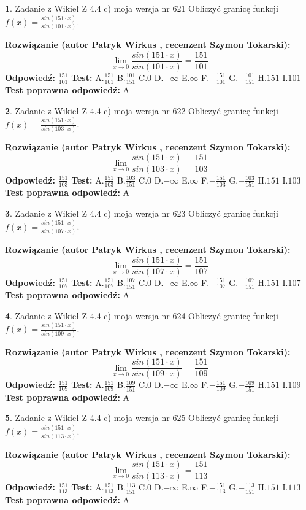 \documentclass[12pt, a4paper]{article}
\theoremstyle{definition} %
\newtheorem{zad}{}
\newcommand{\zadStart}[1]{\begin{zad}#1\newline}
\newcommand{\zadStop}{\end{zad}}
\newcommand{\rozwStart}[2]{\noindent \textbf{Rozwiązanie (autor #1 , recenzent #2): }\newline}
\newcommand{\rozwStop}{\newline}
\newcommand{\odpStart}{\noindent \textbf{Odpowiedź:}\newline}
\newcommand{\odpStop}{\newline}
\newcommand{\testStart}{\noindent \textbf{Test:}\newline}
\newcommand{\testStop}{\newline}
\newcommand{\kluczStart}{\noindent \textbf{Test poprawna odpowiedź:}\newline}
\newcommand{\kluczStop}{\newline}
\begin{document}
\zadStart{Zadanie z Wikieł Z 4.4 c) moja wersja nr 621}
Obliczyć granicę funkcji $f(x)=\frac{sin(151\cdot x)}{sin(101\cdot x)}$.
\zadStop
\rozwStart{Patryk Wirkus}{Szymon Tokarski}
$$\lim\limits_{x\to 0}\frac{sin(151\cdot x)}{sin(101\cdot x)}=
\frac{151}{101}$$
\rozwStop
\odpStart
$\frac{151}{101}$
\odpStop
\testStart
A.$\frac{151}{101}$
B.$\frac{101}{151}$
C.$0$
D.$-\infty$
E.$\infty$
F.$-\frac{151}{101}$
G.$-\frac{101}{151}$
H.$151$
I.$101$
\testStop
\kluczStart
A
\kluczStop



\zadStart{Zadanie z Wikieł Z 4.4 c) moja wersja nr 622}
Obliczyć granicę funkcji $f(x)=\frac{sin(151\cdot x)}{sin(103\cdot x)}$.
\zadStop
\rozwStart{Patryk Wirkus}{Szymon Tokarski}
$$\lim\limits_{x\to 0}\frac{sin(151\cdot x)}{sin(103\cdot x)}=
\frac{151}{103}$$
\rozwStop
\odpStart
$\frac{151}{103}$
\odpStop
\testStart
A.$\frac{151}{103}$
B.$\frac{103}{151}$
C.$0$
D.$-\infty$
E.$\infty$
F.$-\frac{151}{103}$
G.$-\frac{103}{151}$
H.$151$
I.$103$
\testStop
\kluczStart
A
\kluczStop



\zadStart{Zadanie z Wikieł Z 4.4 c) moja wersja nr 623}
Obliczyć granicę funkcji $f(x)=\frac{sin(151\cdot x)}{sin(107\cdot x)}$.
\zadStop
\rozwStart{Patryk Wirkus}{Szymon Tokarski}
$$\lim\limits_{x\to 0}\frac{sin(151\cdot x)}{sin(107\cdot x)}=
\frac{151}{107}$$
\rozwStop
\odpStart
$\frac{151}{107}$
\odpStop
\testStart
A.$\frac{151}{107}$
B.$\frac{107}{151}$
C.$0$
D.$-\infty$
E.$\infty$
F.$-\frac{151}{107}$
G.$-\frac{107}{151}$
H.$151$
I.$107$
\testStop
\kluczStart
A
\kluczStop



\zadStart{Zadanie z Wikieł Z 4.4 c) moja wersja nr 624}
Obliczyć granicę funkcji $f(x)=\frac{sin(151\cdot x)}{sin(109\cdot x)}$.
\zadStop
\rozwStart{Patryk Wirkus}{Szymon Tokarski}
$$\lim\limits_{x\to 0}\frac{sin(151\cdot x)}{sin(109\cdot x)}=
\frac{151}{109}$$
\rozwStop
\odpStart
$\frac{151}{109}$
\odpStop
\testStart
A.$\frac{151}{109}$
B.$\frac{109}{151}$
C.$0$
D.$-\infty$
E.$\infty$
F.$-\frac{151}{109}$
G.$-\frac{109}{151}$
H.$151$
I.$109$
\testStop
\kluczStart
A
\kluczStop



\zadStart{Zadanie z Wikieł Z 4.4 c) moja wersja nr 625}
Obliczyć granicę funkcji $f(x)=\frac{sin(151\cdot x)}{sin(113\cdot x)}$.
\zadStop
\rozwStart{Patryk Wirkus}{Szymon Tokarski}
$$\lim\limits_{x\to 0}\frac{sin(151\cdot x)}{sin(113\cdot x)}=
\frac{151}{113}$$
\rozwStop
\odpStart
$\frac{151}{113}$
\odpStop
\testStart
A.$\frac{151}{113}$
B.$\frac{113}{151}$
C.$0$
D.$-\infty$
E.$\infty$
F.$-\frac{151}{113}$
G.$-\frac{113}{151}$
H.$151$
I.$113$
\testStop
\kluczStart
A
\kluczStop
\end{document}
